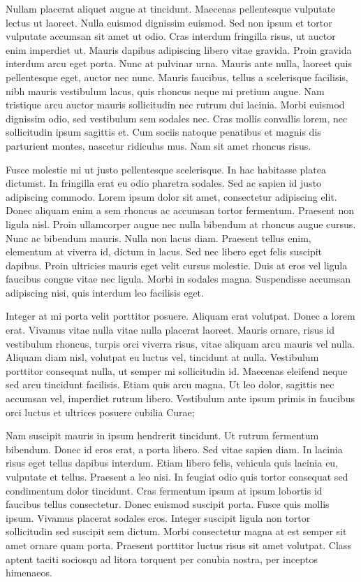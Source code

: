 Nullam placerat aliquet augue at tincidunt. Maecenas pellentesque
vulputate lectus ut laoreet. Nulla euismod dignissim euismod. Sed
non ipsum et tortor vulputate accumsan sit amet ut odio. Cras interdum
fringilla risus, ut auctor enim imperdiet ut. Mauris dapibus adipiscing
libero vitae gravida. Proin gravida interdum arcu eget porta. Nunc
at pulvinar urna. Mauris ante nulla, laoreet quis pellentesque eget,
auctor nec nunc. Mauris faucibus, tellus a scelerisque facilisis,
nibh mauris vestibulum lacus, quis rhoncus neque mi pretium augue.
Nam tristique arcu auctor mauris sollicitudin nec rutrum dui lacinia.
Morbi euismod dignissim odio, sed vestibulum sem sodales nec. Cras
mollis convallis lorem, nec sollicitudin ipsum sagittis et. Cum sociis
natoque penatibus et magnis dis parturient montes, nascetur ridiculus
mus. Nam sit amet rhoncus risus.

Fusce molestie mi ut justo pellentesque scelerisque. In hac habitasse
platea dictumst. In fringilla erat eu odio pharetra sodales. Sed ac
sapien id justo adipiscing commodo. Lorem ipsum dolor sit amet, consectetur
adipiscing elit. Donec aliquam enim a sem rhoncus ac accumsan tortor
fermentum. Praesent non ligula nisl. Proin ullamcorper augue nec nulla
bibendum at rhoncus augue cursus. Nunc ac bibendum mauris. Nulla non
lacus diam. Praesent tellus enim, elementum at viverra id, dictum
in lacus. Sed nec libero eget felis suscipit dapibus. Proin ultricies
mauris eget velit cursus molestie. Duis at eros vel ligula faucibus
congue vitae nec ligula. Morbi in sodales magna. Suspendisse accumsan
adipiscing nisi, quis interdum leo facilisis eget.

Integer at mi porta velit porttitor posuere. Aliquam erat volutpat.
Donec a lorem erat. Vivamus vitae nulla vitae nulla placerat laoreet.
Mauris ornare, risus id vestibulum rhoncus, turpis orci viverra risus,
vitae aliquam arcu mauris vel nulla. Aliquam diam nisl, volutpat eu
luctus vel, tincidunt at nulla. Vestibulum porttitor consequat nulla,
ut semper mi sollicitudin id. Maecenas eleifend neque sed arcu tincidunt
facilisis. Etiam quis arcu magna. Ut leo dolor, sagittis nec accumsan
vel, imperdiet rutrum libero. Vestibulum ante ipsum primis in faucibus
orci luctus et ultrices posuere cubilia Curae;

Nam suscipit mauris in ipsum hendrerit tincidunt. Ut rutrum fermentum
bibendum. Donec id eros erat, a porta libero. Sed vitae sapien diam.
In lacinia risus eget tellus dapibus interdum. Etiam libero felis,
vehicula quis lacinia eu, vulputate et tellus. Praesent a leo nisi.
In feugiat odio quis tortor consequat sed condimentum dolor tincidunt.
Cras fermentum ipsum at ipsum lobortis id faucibus tellus consectetur.
Donec euismod suscipit porta. Fusce quis mollis ipsum. Vivamus placerat
sodales eros. Integer suscipit ligula non tortor sollicitudin sed
suscipit sem dictum. Morbi consectetur magna at est semper sit amet
ornare quam porta. Praesent porttitor luctus risus sit amet volutpat.
Class aptent taciti sociosqu ad litora torquent per conubia nostra,
per inceptos himenaeos.

